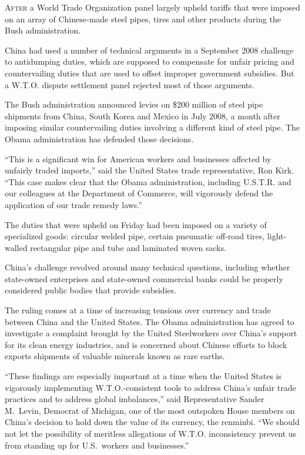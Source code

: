 ﻿\documentclass[12pt]{article}
\begin{document}
\lettrine{A}{fter} a World Trade Organization panel largely upheld tariffs
that were imposed on an array of Chinese-made steel pipes, tires and other products during the Bush
administration.

China had used a number of technical arguments in a September 2008 challenge to antidumping duties,
which are supposed to compensate for unfair pricing and countervailing duties that are used to
offset improper government subsidies. But a W.T.O. dispute settlement panel rejected most of those
arguments.

The Bush administration announced levies on \$200 million of steel pipe shipments from China, South
Korea and Mexico in July 2008, a month after imposing similar countervailing duties involving a
different kind of steel pipe. The Obama administration has defended those decisions.

``This is a significant win for American workers and businesses affected by unfairly traded
imports,'' said the United States trade representative, Ron Kirk. ``This case makes clear that the
Obama administration, including U.S.T.R. and our colleagues at the Department of Commerce, will
vigorously defend the application of our trade remedy laws.''

The duties that were upheld on Friday had been imposed on a variety of specialized goods: circular
welded pipe, certain pneumatic off-road tires, light-walled rectangular pipe and tube and laminated
woven sacks.

China's challenge revolved around many technical questions, including whether state-owned
enterprises and state-owned commercial banks could be properly considered public bodies that provide
subsidies.

The ruling comes at a time of increasing tensions over currency and trade between China and the
United States. The Obama administration has agreed to investigate a complaint brought by the United
Steelworkers over China's support for its clean energy industries, and is concerned about Chinese
efforts to block exports shipments of valuable minerals known as rare earths.

``These findings are especially important at a time when the United States is vigorously
implementing W.T.O.-consistent tools to address China's unfair trade practices and to address global
imbalances,'' said Representative Sander M.~Levin, Democrat of Michigan, one of the most outspoken
House members on China's decision to hold down the value of its currency, the renminbi. ``We should
not let the possibility of meritless allegations of W.T.O. inconsistency prevent us from standing up
for U.S.~workers and businesses.''
\end{document}
